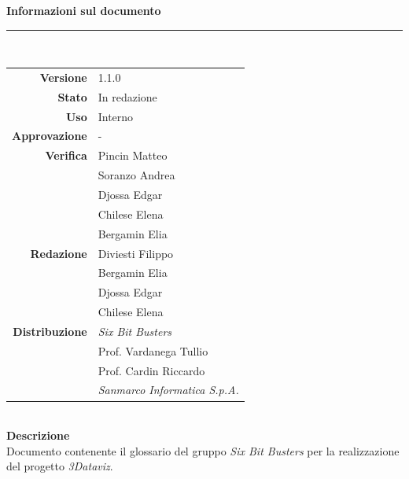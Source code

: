 \begin{titlepage}
\begin{center}
	\large \textbf{Informazioni sul documento} \\
	\rule{0.6\textwidth}{0.4pt}
	\\[0.5cm]
	\begin{tabular}{r|l}
		\textbf{Versione} & 1.1.0\\
		\textbf{Stato} & In redazione\\
		\textbf{Uso} & Interno\\                         
		\textbf{Approvazione} & -\\                      
		\textbf{Verifica} & Pincin Matteo \\ & Soranzo Andrea \\ & Djossa Edgar \\ & Chilese Elena\\ & Bergamin Elia\\                        
		\textbf{Redazione} & Diviesti Filippo\\ & Bergamin Elia \\ & Djossa Edgar\\ & Chilese Elena \\
		\textbf{Distribuzione} & \textit{Six Bit Busters} \\ & Prof. Vardanega Tullio \\ & Prof. Cardin Riccardo \\ & \textit{Sanmarco Informatica S.p.A.}
	\end{tabular}	
	\\[0.8cm]

	\large \textbf{Descrizione} \\
	Documento contenente il glossario del gruppo \textit{Six Bit Busters} per la realizzazione del progetto \textit{3Dataviz}.
	
	\end{center}
\end{titlepage}
